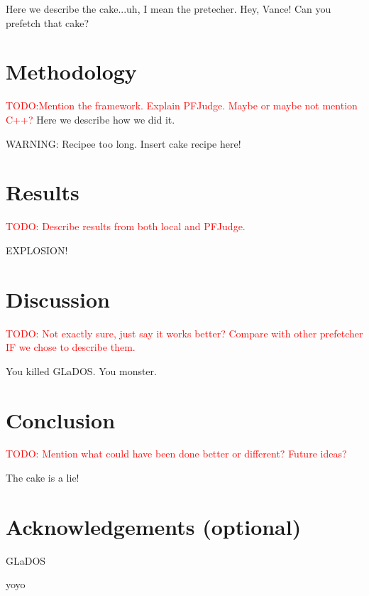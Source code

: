 \documentclass[a4paper]{IEEEtran}
\newcommand\TODO[1]{\textcolor{red}{TODO:#1}}
\newcommand\todo[1]{\TODO{#1}}
\begin{document}
Here we describe the cake...uh, I mean the pretecher. Hey, Vance! Can you prefetch that cake?

\section{Methodology}

\todo{Mention the framework. Explain PFJudge. Maybe or maybe not mention C++?}
Here we describe how we did it.

WARNING: Recipee too long. Insert cake recipe here!

\section{Results}

\todo{ Describe results from both local and PFJudge.}

EXPLOSION!

\section{Discussion}

\todo{ Not exactly sure, just say it works better? Compare with other prefetcher IF we chose to describe them. }

You killed GLaDOS.
You monster.

\section{Conclusion}

\todo{ Mention what could have been done better or different? Future ideas? }

The cake is a lie!

\section{Acknowledgements (optional)}

GLaDOS

yoyo \cite{assignment-text}



\nocite{*}
\end{document}
